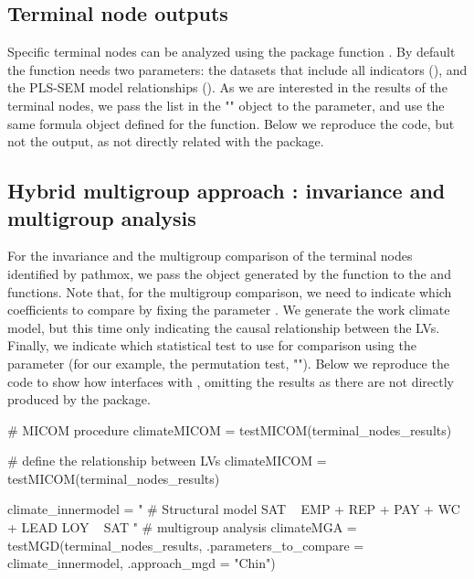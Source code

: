 \subsection{Terminal node outputs}

Specific terminal nodes can be analyzed using the   package function  . By default the   function needs two parameters: the datasets that include all indicators (), and the PLS-SEM model relationships ().  As we are interested in the results of the terminal nodes, we pass the  list in the "" object to the  parameter, and use the same formula object defined for the   function. Below we reproduce the code, but not the output, as not directly related with the  package. 


\subsection{Hybrid multigroup approach \citep{Lamberti21}: invariance and multigroup analysis}

For the invariance and the multigroup comparison of the terminal nodes identified by pathmox, we pass the object generated by the  function to the  and   functions. Note that, for the multigroup comparison, we need to indicate which coefficients to compare by fixing the parameter 
 . We generate the work climate model,  but this time only indicating the causal relationship between the LVs. Finally, we indicate which statistical test to use for comparison using the  parameter (for our example, the permutation test, ""). Below we reproduce the code to show how  interfaces with , omitting the results as there are not directly produced by the  package.
 
 \begin{example}
# MICOM procedure
climateMICOM = testMICOM(terminal_nodes_results)

# define the relationship between LVs
climateMICOM = testMICOM(terminal_nodes_results)

climate_innermodel = "
	# Structural model
	SAT ~ EMP + REP + PAY + WC + LEAD
	LOY ~   SAT
	"
# multigroup analysis
climateMGA = testMGD(terminal_nodes_results, 
					.parameters_to_compare = climate_innermodel,
                     		   .approach_mgd = "Chin")

\end{example}

